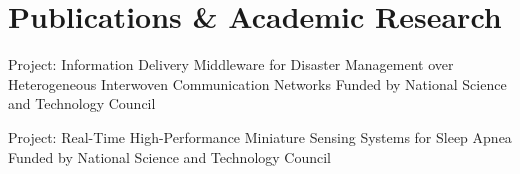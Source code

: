 \section{Publications \& Academic Research}
\begin{resumeitems}
\item {Project: Information Delivery Middleware for Disaster Management over Heterogeneous Interwoven Communication Networks \textbar{} Funded by National Science and Technology Council}
\item {Project: Real-Time High-Performance Miniature Sensing Systems for Sleep Apnea \textbar{} Funded by National Science and Technology Council}
\end{resumeitems}
